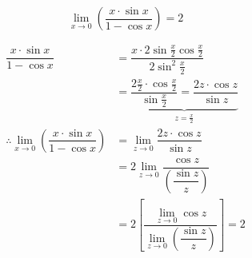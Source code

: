 \documentclass[14pt,fleqn]{extarticle}
\begin{document}
 

\[ \lim_{x\to 0}\left( \dfrac{x\cdot\sin x}{1-\cos x} \right) = 2 \]

\newcard 

\begin{align}
\dfrac{x\cdot\sin x}{1-\cos x} &= \dfrac{x\cdot 2\sin\frac{x}{2}\cos\frac{x}{2}}{2\sin^2\frac{x}{2}} \\
&= \underbrace{\dfrac{2\frac{x}{2}\cdot\cos\frac{x}{2}}{\sin\frac{x}{2}} = \dfrac{2z\cdot\cos z}{\sin z}}_{z = \frac{x}{2}}\\
\therefore \lim_{x\to 0}\left( \dfrac{x\cdot\sin x}{1-\cos x} \right) &= \lim_{z\to 0}\dfrac{2z\cdot\cos z}{\sin z} \\
&= 2\lim_{z\to 0}\dfrac{\cos z}{\left(\dfrac{\sin z}{z}\right)} \\
&= 2\left[ \dfrac{\lim_{z\to 0}\cos z}{\lim_{z\to 0}\left( \dfrac{\sin z}{z}\right)}\right] = 2
\end{align}
\end{document}
